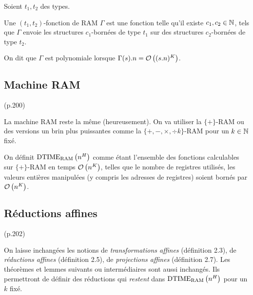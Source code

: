 	
		\begin{definition}
			\label{def:fonction_de_RAM}
			Soient $t_1, t_2$ des types. 
			
			Une $(t_1, t_2)$-fonction de RAM $\Gamma$ est une fonction telle qu'il existe $c_1, c_2 \in \mathbb{N}$, tels que $\Gamma$ envoie les structures $c_1$-bornées de type $t_1$ sur des structures $c_2$-bornées de type $t_2$\footnotemark.
			
			
			On dit que $\Gamma$ est polynomiale lorsque $\Gamma(s).n = \mathcal{O}\left( (s.n)^K \right)$.
			
		\end{definition}
	
	
	
		\subsection{Machine RAM} (p.200)
			\label{subsec:machine_RAM}
		
		La machine RAM reste la même (heureusement). On va utiliser la $\{+\}$-RAM ou des versions un brin plus puissantes comme la $\{+ , -, \times, \div k \}$-RAM pour un $k\in \mathbb{N}$ fixé\footnotemark. 
		
		
		\begin{definition}
			\label{def:temps_poly_RAM}
			On définit $\text{DTIME}_{\text{RAM}}\left( n^H \right)$ comme étant l'ensemble des fonctions calculables sur $\{+\}$-RAM en temps $\mathcal{O}\left( n^K \right)$, telles que le nombre de registres utilisés, les valeurs entières manipulées (y compris les adresses de registres) soient bornés par $\mathcal{O}\left( n^K \right)$.
		\end{definition}
		
		
		
		\subsection{Réductions affines} (p.202)
			\label{subsec:reductions_affines}

		On laisse inchangées les notions de \emph{transformations affines} (définition 2.3), de \emph{réductions affines} (définition 2.5), de \emph{projections affines} (définition 2.7). Les théorèmes et lemmes suivants ou intermédiaires sont aussi inchangés. Ils permettront de définir des réductions qui \emph{restent} dans $\text{DTIME}_{\text{RAM}}\left( n^H \right)$ pour un $k$ fixé. 
		
